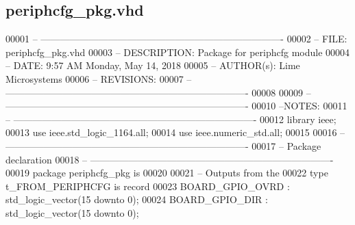 \subsection{periphcfg\+\_\+pkg.\+vhd}
\label{periphcfg__pkg_8vhd_source}

\begin{DoxyCode}
00001 \textcolor{keyword}{-- ----------------------------------------------------------------------------}
00002 \textcolor{keyword}{-- FILE:          periphcfg\_pkg.vhd}
00003 \textcolor{keyword}{-- DESCRIPTION:   Package for periphcfg module}
00004 \textcolor{keyword}{-- DATE:          9:57 AM Monday, May 14, 2018}
00005 \textcolor{keyword}{-- AUTHOR(s):     Lime Microsystems}
00006 \textcolor{keyword}{-- REVISIONS:}
00007 \textcolor{keyword}{-- ----------------------------------------------------------------------------}
00008 
00009 \textcolor{keyword}{-- ----------------------------------------------------------------------------}
00010 \textcolor{keyword}{--NOTES:}
00011 \textcolor{keyword}{-- ----------------------------------------------------------------------------}
00012 \textcolor{vhdlkeyword}{library }\textcolor{keywordflow}{ieee};
00013 \textcolor{vhdlkeyword}{use }ieee.std\_logic\_1164.\textcolor{keywordflow}{all};
00014 \textcolor{vhdlkeyword}{use }ieee.numeric\_std.\textcolor{keywordflow}{all};
00015 
00016 \textcolor{keyword}{-- ----------------------------------------------------------------------------}
00017 \textcolor{keyword}{-- Package declaration}
00018 \textcolor{keyword}{-- ----------------------------------------------------------------------------}
00019 \textcolor{keywordflow}{package }periphcfg_pkg \textcolor{keywordflow}{is}
00020    
00021 \textcolor{keyword}{   -- Outputs from the }
00022    \textcolor{keywordflow}{type} \textcolor{vhdlchar}{t_FROM_PERIPHCFG} \textcolor{keywordflow}{is} \textcolor{keywordflow}{record}
00023       \textcolor{vhdlchar}{BOARD_GPIO_OVRD}      \textcolor{vhdlchar}{:} \textcolor{comment}{std\_logic\_vector}\textcolor{vhdlchar}{(}\textcolor{vhdllogic}{}\textcolor{vhdllogic}{15} \textcolor{keywordflow}{downto} \textcolor{vhdllogic}{}\textcolor{vhdllogic}{0}\textcolor{vhdlchar}{)};
00024       \textcolor{vhdlchar}{BOARD_GPIO_DIR}       \textcolor{vhdlchar}{:} \textcolor{comment}{std\_logic\_vector}\textcolor{vhdlchar}{(}\textcolor{vhdllogic}{}\textcolor{vhdllogic}{15} \textcolor{keywordflow}{downto} \textcolor{vhdllogic}{}\textcolor{vhdllogic}{0}\textcolor{vhdlchar}{)};

\end{DoxyCode}
